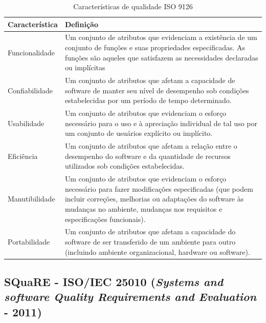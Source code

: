 \documentclass[
	12pt,				%
	openright,			%
	oneside,			%
	a4paper,			%
	english,			%
	brazil,				%
	]{abntex2}
\begin{document}
\begin{table}[H]
    \centering
    \caption{Características de qualidade ISO 9126}
    \label{tab:iso9126-caracteristicas}
    \small %
    \begin{tabular}{p{3cm} p{12.0cm}}
        \toprule
        \textbf{Característica} & \textbf{Definição} \\ \midrule
        Funcionalidade & Um conjunto de atributos que evidenciam a existência de um conjunto de funções e suas propriedades especificadas. As funções são aqueles que satisfazem as necessidades declaradas ou implícitas \\
        \rowcolor[HTML]{EFEFEF}
        Confiabilidade & Um conjunto de atributos que afetam a capacidade de software de manter seu nível de desempenho sob condições estabelecidas por um período de tempo determinado. \\
        Usabilidade & Um conjunto de atributos que evidenciam o esforço necessário para o uso e à apreciação individual de tal uso por um conjunto de usuários explícito ou implícito. \\
        \rowcolor[HTML]{EFEFEF}
        Eficiência & Um conjunto de atributos que afetam a relação entre o desempenho do software e da quantidade de recursos utilizados sob condições estabelecidas. \\
        Manutibilidade & Um conjunto de atributos que evidenciam o esforço necessário para fazer modificações especificadas (que podem incluir correções, melhorias ou adaptações do software às mudanças no ambiente, mudanças nos requisitos e especificações funcionais). \\
        \rowcolor[HTML]{EFEFEF}
        Portabilidade & Um conjunto de atributos que afetam a capacidade do software de ser transferido de um ambiente para outro (incluindo ambiente organizacional, hardware ou software). \\ \bottomrule
    \end{tabular}
\end{table}

\subsection{SQuaRE - ISO/IEC 25010 (\emph{Systems and software Quality Requirements
and Evaluation} - 2011)}
\end{document}
